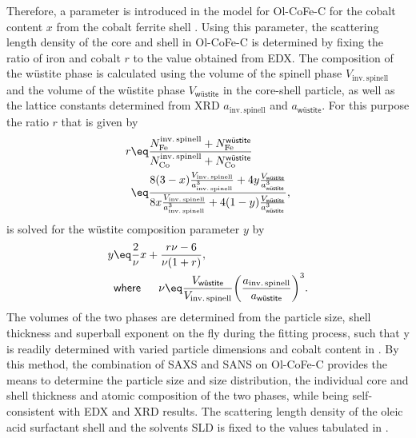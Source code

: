 \documentclass[\main/dresen_thesis.tex]{subfiles}
\begin{document}
    Therefore, a parameter is introduced in the model for Ol-CoFe-C for the cobalt content $x$ from the cobalt ferrite shell .
    Using this parameter, the scattering length density of the core and shell in Ol-CoFe-C is determined by fixing the ratio of iron and cobalt $r$ to the value obtained from EDX.
    The composition of the w\"ustite phase  is calculated using the volume of the spinell phase $V_\mathrm{inv.\,spinell}$ and the volume of the w\"ustite phase $V_\textsf{w\"ustite}$ in the core-shell particle, as well as the lattice constants determined from XRD $a_\mathrm{inv.\,spinell}$ and $a_\textsf{w\"ustite}$.
    For this purpose the ratio $r$ that is given by
    \begin{align}
      \begin{split}
        r &\eq \frac{N_\mathrm{Fe}^\mathrm{inv.\, spinell} + N_\mathrm{Fe}^\textsf{w\"ustite}}
                    {N_\mathrm{Co}^\mathrm{inv.\, spinell} + N_\mathrm{Co}^\textsf{w\"ustite}} \\
          &\eq \frac
                 {8 (3-x) \frac{V_\mathrm{inv.\,spinell}}{a_\mathrm{inv.\,spinell}^3} +
                  4 y \frac{V_\textsf{w\"ustite}}{a_\textsf{w\"ustite}^3}}
                 {8 x \frac{V_\mathrm{inv.\,spinell}}{a_\mathrm{inv.\,spinell}^3} +
                  4 (1-y) \frac{V_\textsf{w\"ustite}}{a_\textsf{w\"ustite}^3}},
      \end{split}
    \end{align}
    is solved for the w\"ustite composition parameter $y$ by
    \begin{align}
      y &\eq \frac{2}{\nu} x + \frac{r \nu - 6}{\nu (1 + r)},\\
        & \textsf{where\,} \hspace{0.5cm} \nu \eq \frac{V_\textsf{w\"ustite}}{V_\mathrm{inv.\,spinell}} \biggl( \frac{a_\mathrm{inv.\,spinell}}{a_\textsf{w\"ustite}} \biggr)^3.
    \end{align}
    The volumes of the two phases are determined from the particle size, shell thickness and superball exponent on the fly during the fitting process, such that y is readily determined with varied particle dimensions and cobalt content in .
    By this method, the combination of SAXS and SANS on Ol-CoFe-C provides the means to determine the particle size and size distribution, the individual core and shell thickness and atomic composition of the two phases, while being self-consistent with EDX and XRD results.
    The scattering length density of the oleic acid surfactant shell and the solvents SLD is fixed to the values tabulated in .
\end{document}
